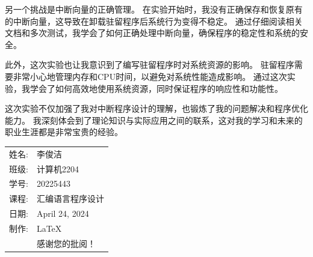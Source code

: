 \documentclass[12pt]{article}
\begin{document}
另一个挑战是中断向量的正确管理。
在实验开始时，我没有正确保存和恢复原有的中断向量，这导致在卸载驻留程序后系统行为变得不稳定。
通过仔细阅读相关文档和多次测试，我学会了如何正确处理中断向量，确保程序的稳定性和系统的安全。

此外，这次实验也让我意识到了编写驻留程序时对系统资源的影响。
驻留程序需要非常小心地管理内存和CPU时间，以避免对系统性能造成影响。
通过这次实验，我学会了如何高效地使用系统资源，同时保证程序的响应性和功能性。

这次实验不仅加强了我对中断程序设计的理解，也锻炼了我的问题解决和程序优化能力。
我深刻体会到了理论知识与实际应用之间的联系，这对我的学习和未来的职业生涯都是非常宝贵的经验。

\begin{flushright}\begin{tabular}{rl}
    姓名: & 李俊洁\\
    班级: & 计算机2204 \\
    学号: & 20225443 \\
    课程: & 汇编语言程序设计 \\
    日期: & April 24, 2024 \\
    制作: & \LaTeX \\
    & 感谢您的批阅！
\end{tabular}\end{flushright}
\end{document}
